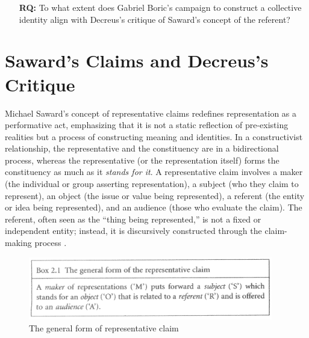 \begin{itemize}
	\item [\textbf{RQ:}] To what extent does Gabriel Boric’s campaign to construct a collective identity align with Decreus's critique of Saward's concept of the referent?
\end{itemize}

\chapter{Saward’s Claims and
  Decreus’s Critique}

Michael Saward’s concept of representative claims redefines representation as a performative act, emphasizing that it is not a static reflection of pre-existing realities but a process of constructing meaning and identities. In a constructivist relationship, the representative and the constituency are in a bidirectional process, whereas the representative (or the representation itself) forms the constituency as much as it \textit{stands for it}.
A representative claim involves a maker (the individual or group asserting representation), a subject (who they claim to represent), an object (the issue or value being represented), a referent (the entity or idea being represented), and an audience (those who evaluate the claim). The referent, often seen as the “thing being represented,” is not a fixed or independent entity; instead, it is discursively constructed through the claim-making process \parencite[see 37]{saward2010}.

\begin{figure}
	\begin{center}
		\includegraphics[width=0.95\textwidth]{Figures/image.png}
	\end{center}
	\caption{The general form of representative claim \parencite[36]{saward2010}}\label{fig:claim}
\end{figure}

